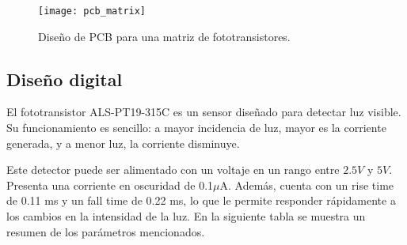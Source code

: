             \begin{figure}[hbtp]
                \centering
                \texttt{[image: pcb\_matrix]}
                \caption{Diseño de PCB para una matriz de fototransistores.}
                \label{fig:pcb_matrix}
            \end{figure}

\subsection{Diseño digital}
El fototransistor ALS-PT19-315C es un sensor diseñado para detectar luz visible. Su funcionamiento es sencillo: a mayor incidencia de luz, mayor es la corriente generada, y a menor luz, la corriente disminuye.

Este detector puede ser alimentado con un voltaje en un rango entre $2.5V$ y $5V$. Presenta una corriente en oscuridad de 0.1$\mu$A. Además, cuenta con un rise time de 0.11 ms y un fall time de 0.22 ms, lo que le permite responder rápidamente a los cambios en la intensidad de la luz. En la siguiente tabla se muestra un resumen de los parámetros mencionados.

            \begin{table}[htbp]
                \caption{Parámetros del fototransistor ALS-PT19-315C}
                \begin{center}
                \label{tab:als_param}
                \end{center}
            \end{table}


